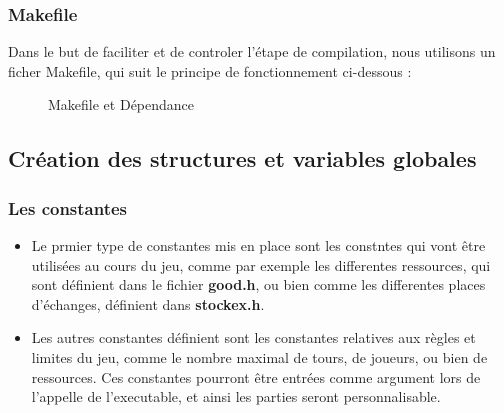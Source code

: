 \documentclass{article}
\begin{document}
\subsubsection{Makefile}
Dans le but de faciliter et de controler l'\'etape de compilation, nous utilisons un ficher Makefile, qui suit le principe de fonctionnement ci-dessous :
\begin{figure}[h]
  \begin{center}
  \caption[le titre]{Makefile et D\'ependance}
\end{center}
\end{figure}
\subsection{Cr\'eation des structures et variables globales}

\subsubsection{Les constantes}

\begin{itemize}

\item Le prmier type de constantes mis en place sont les constntes qui vont \^etre utilis\'ees au cours du jeu, comme par exemple les differentes ressources,
qui sont d\'efinient dans le fichier \textbf{good.h}, ou bien comme les differentes places d'\'echanges, d\'efinient dans \textbf{stockex.h}.
\item Les autres constantes d\'efinient sont les constantes relatives aux r\`egles et limites du jeu, comme le nombre maximal de tours, de joueurs, ou bien de ressources. 
Ces constantes pourront \^etre entr\'ees comme argument lors de l'appelle de l'executable, et ainsi les parties seront personnalisable. 

\end{itemize} 
\end{document}
